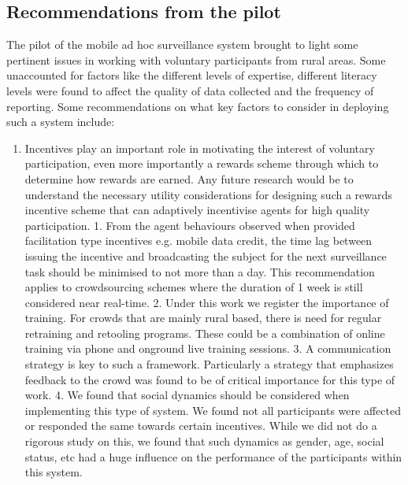 \documentclass[letterpaper]{article} %
\begin{document}
\subsection{Recommendations from the pilot}
The pilot of the mobile ad hoc surveillance system brought to light some pertinent issues in working with voluntary participants from rural areas. Some unaccounted for factors like the different levels of expertise, different literacy levels were found to affect the quality of data collected and the frequency of reporting. Some recommendations on what key factors to consider in deploying such a system include:
\begin{enumerate}
\item Incentives play an important role in motivating the interest of voluntary participation, even more importantly a rewards scheme through which to determine how rewards are earned. Any future research would be to understand the necessary utility considerations for designing such a rewards incentive scheme that can adaptively incentivise agents for high quality participation.
1. From the agent behaviours observed when provided facilitation type incentives e.g. mobile data credit, the time lag between issuing the incentive and broadcasting the subject for the next surveillance task should be minimised to not more than a day. This recommendation applies to crowdsourcing schemes where the duration of 1 week is still considered near real-time.
2. Under this work we register the importance of training. For crowds that are mainly rural based, there is need for regular retraining and retooling programs. These could be a combination of online training via phone and onground live training sessions.
3. A communication strategy is key to such a framework. Particularly a strategy that emphasizes feedback to the crowd was found to be of critical importance for this type of work.
4. We found that social dynamics should be considered when implementing this type of system. We found not all participants were affected or responded the same towards certain incentives. While we did not do a rigorous study on this, we found that such dynamics as gender, age, social status, etc had a huge influence on the performance of the participants within this system.
\end{enumerate}

\vspace{-1.04mm}
\vspace{-1.96mm}
\end{document}
